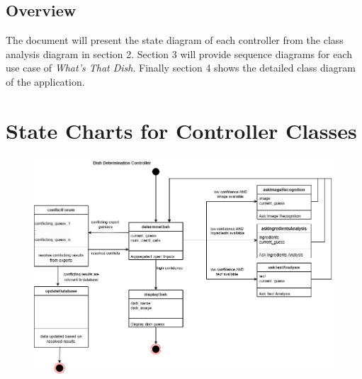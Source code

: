 \documentclass[]{article}
\begin{document}

\subsection{Overview}
\label{sub:overview}
The document will present the state diagram of each controller from the class analysis diagram in section 2.
Section 3 will provide sequence diagrams for each use case of \textit{What's That Dish}.
Finally section 4 shows the detailed class diagram of the application.



\section{State Charts for Controller Classes}
\label{sec:state_charts_for_controller_classes}
\begin{figure}[H]
	\centering
   \includegraphics[width=\textwidth]{image/D3_state_diagrams/dish_determination.png}
\end{figure}
\end{document}
